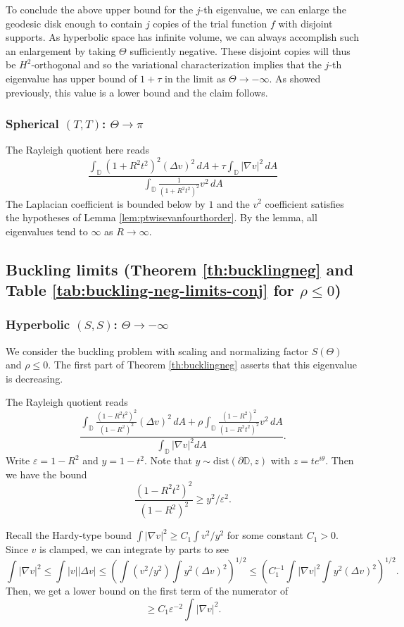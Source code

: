 \documentclass[11pt]{amsart}
\theoremstyle{definition}
\numberwithin{equation}{section}
\newcommand{\lapl}{\Delta}
\newcommand{\grad}{\nabla}
\newcommand{\D}{\mathbb{D}}
\begin{document}
To conclude the above upper bound for the $j$-th eigenvalue, we can enlarge the geodesic disk enough to contain $j$ copies of the trial function $f$ with disjoint supports. As hyperbolic space has infinite volume, we can always accomplish such an enlargement by taking $\Theta$ sufficiently negative. These disjoint copies will thus be $H^2$-orthogonal and so the variational characterization implies that the $j$-th eigenvalue has upper bound of $1+\tau$ in the limit as $\Theta \to -\infty$. As showed previously, this value is a lower bound and the claim follows.

\subsubsection*{Spherical $(T,T)$: $\Theta \to \pi$}

The Rayleigh quotient here reads
\[
\dfrac{\displaystyle \int_{\D}(1 + R^2t^2)^2(\lapl v)^2 \,  dA +  \tau\int_{\D}|\grad v|^2 \, dA}{\displaystyle \int_{\D}\frac{1}{(1 + R^2t^2)^2}v^2 \, dA}
\]
The Laplacian coefficient is bounded below by $1$ and the $v^2$ coefficient satisfies the hypotheses of Lemma \ref{lem:ptwisevanfourthorder}. By the lemma, all eigenvalues tend to $\infty$ as $R \to \infty$.


\subsection*{Buckling limits (Theorem \ref{th:bucklingneg} and Table \ref{tab:buckling-neg-limits-conj} for $\rho \leq 0$)}

\subsubsection*{Hyperbolic $(S,S)$: $\Theta \to -\infty$}

We consider the buckling problem with scaling and normalizing factor $S(\Theta)$ and $\rho \leq 0$. The first part of Theorem \ref{th:bucklingneg} asserts that this eigenvalue is decreasing.


The Rayleigh quotient reads
\[
\dfrac{\displaystyle \int_{\D}\frac{(1- R^2t^2)^2}{(1 -  R^2)^2}(\lapl v)^2 \,  dA +\rho\int_{\D}\frac{(1 -  R^2)^2}{(1 -  R^2t^2)^2}v^2 \, dA}{\displaystyle \int_{\D} |\grad v|^2 dA}.
\]
Write $\varepsilon = 1-R^2$ and $y = 1-t^2$. Note that $y \sim \text{dist}(\partial \D, z)$ with $z = te^{i\theta}$. Then we have the bound
\[
\frac{(1-R^2t^2)^2}{(1-R^2)^2} \geq y^2/\varepsilon^2. 
\]

Recall the Hardy-type bound $\int |\grad v|^2 \geq C_1 \int v^2/y^2$ for some constant $C_1 > 0$. Since $v$ is clamped, we can integrate by parts to see
\[
\int |\grad v|^2 \leq \int |v||\lapl v| \leq \left (\int (v^2/y^2)\int y^2(\lapl v)^2 \right)^{1/2} \leq \left (C_1^{-1}\int |\grad v|^2\int y^2(\lapl v)^2 \right)^{1/2}.
\]
Then, we get a lower bound on the first term of the numerator of
\[
\geq C_1 \varepsilon^{-2} \int |\grad v|^2.
\]
\end{document}
